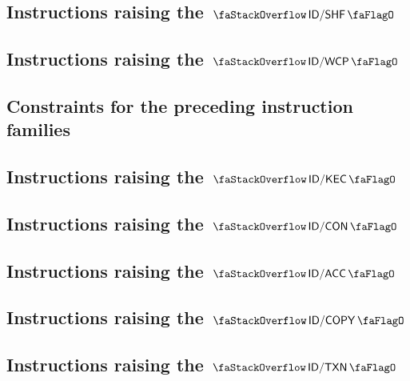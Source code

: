 \subsection{Instructions raising the $\stackDecShfFlag$          \lispDone{}}   \label{hub: instruction handling: shf}                     
\subsection{Instructions raising the $\stackDecWcpFlag$          \lispDone{}}   \label{hub: instruction handling: wcp}                     
\subsection{Constraints for the preceding instruction families   \lispDone{}}   \label{hub: instruction handling: stateless constraints}   
\subsection{Instructions raising the $\stackDecKecFlag$          \lispDone{}}   \label{hub: instruction handling: kec}                     
\subsection{Instructions raising the $\stackDecConFlag$          \lispDone{}}   \label{hub: instruction handling: con}                     
\subsection{Instructions raising the $\stackDecAccFlag$          \lispDone{}}   \label{hub: instruction handling: acc}                     
\subsection{Instructions raising the $\stackDecCopyFlag$         \lispDone{}}   \label{hub: instruction handling: copy}                    
\subsection{Instructions raising the $\stackDecTxnFlag$          \lispDone{}}   \label{hub: instruction handling: txn}                     
